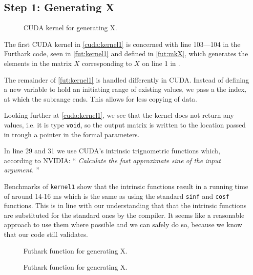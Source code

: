 \subsection{
    Step 1: Generating X
}

\begin{figure}[H]
    \centering
    \caption{CUDA kernel for generating X.}
    \label{cuda:kernel1}
\end{figure}



The first CUDA kernel in \autoref{cuda:kernel1} is concerned with line 103---104
in the Furthark code, seen in \autoref{fut:kernel1} and defined in \autoref{fut:mkX},
which generates the elements in the matrix \(X\) corresponding to \(X\) on line
1 in \cite[Algorithm 1, \textsc{BFAST}, p. 3]{bfast}.

The remainder of \autoref{fut:kernel1} is handled differently in CUDA. Instead of
defining a new variable to hold an initiating range of existing values, we pass a
the index, at which the subrange ends. This allows for less copying of data.

Looking further at \autoref{cuda:kernel1}, we see that the kernel does not
return any values, i.e. it is type \texttt{void}, so the output matrix is
written to the location passed in trough a pointer in the formal parameters.


In line 29 and 31 we use CUDA's intrinsic trignometric functions which,
according to NVIDIA:
\enquote{
    \textit{
Calculate the fast approximate sine of the input argument.
}
}

Benchmarks of \texttt{kernel1} show that the intrinsic functions result in a
running time of around 14-16 ms which is the same as using the standard
\texttt{sinf} and \texttt{cosf} functions. This is in line with our
understanding that that the intrinsic functions are substituted for the standard
ones by the compiler. It seems like a reasonable approach to use them where
possible and we can safely do so, because we know that our code still validates.

\begin{figure}[H]
    \centering
    \caption{Futhark function for generating X.}
    \label{fut:kernel1}
\end{figure}


\begin{figure}[H]
    \centering
    \caption{Futhark function for generating X.}
    \label{fut:mkX}
\end{figure}



